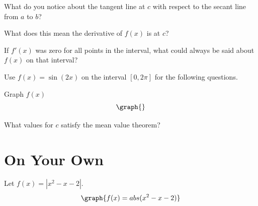 \documentclass{ximera}
\begin{document}
\begin{question}
What do you notice about the tangent line at $c$ with respect to the secant line from $a$ to $b$?

\begin{multipleChoice}
\end{multipleChoice}

What does this mean the derivative of $f(x)$ is at $c$?

\begin{multipleChoice}
\end{multipleChoice}

If $f'(x)$ was zero for all points in the interval, what could always be said about $f(x)$ on that interval?
\begin{multipleChoice}
\end{multipleChoice}

\end{question}
\begin{question}
Use $f(x)=\sin(2x)$ on the interval $[0,2\pi]$ for the following questions.

Graph $f(x)$
\[
\graph{}
\]

What values for $c$ satisfy the mean value theorem?

\begin{selectAll}
\choice{$\pi$}
\end{selectAll}

\end{question}

\section{On Your Own}
Let $f(x)=\left|x^2-x-2\right|$.
\[
\graph{f(x)=abs(x^2-x-2)}
\]
\end{document}
